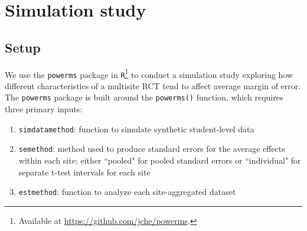 \documentclass[]{article}
\begin{document}



\section{Simulation study}

\subsection{Setup}

We use the \texttt{powerms} package in \texttt{R}\footnote{Available at \href{https://github.com/jche/powerms}{https://github.com/jche/powerms}.} to conduct a simulation study exploring how different characteristics of a multisite RCT tend to affect average margin of error.
The \texttt{powerms} package is built around the \texttt{powerms()} function, which requires three primary inputs:
\begin{enumerate}
    \item \texttt{sim\textunderscore data\textunderscore method}: function to simulate synthetic student-level data
    \item \texttt{se\textunderscore method}: method used to produce standard errors for the average effects within each site; either ``pooled" for pooled standard errors \citep{bloom2017using} or ``individual" for separate t-test intervals for each site
    \item \texttt{est\textunderscore method}: function to analyze each site-aggregated dataset
\end{enumerate}
\end{document}
